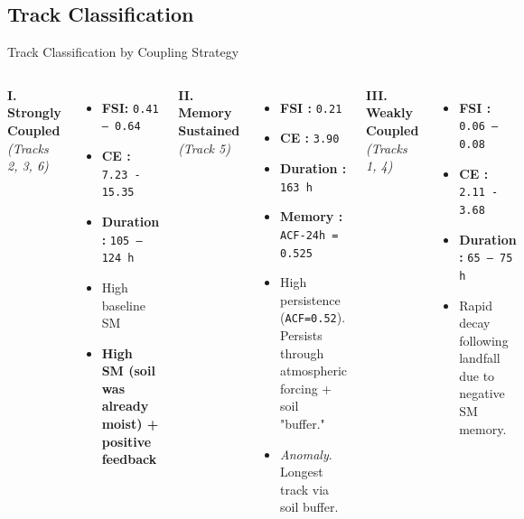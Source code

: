 \documentclass[8pt, aspectratio=169]{beamer}
\begin{document}
\subsection{Track Classification}
\begin{frame}{Track Classification by Coupling Strategy}
    \footnotesize
    \begin{center}
        \begin{columns}[T]
            \textbf{I. Strongly Coupled} \textit{(Tracks 2, 3, 6)}
            \begin{itemize}
                \item \textbf{FSI:} \texttt{0.41 -- 0.64}
                \item \textbf{CE :} \texttt{7.23 - 15.35}
                \item \textbf{Duration :} \texttt{105 -- 124 h}
                \item High baseline SM 
                \item \textbf{High SM (soil was already moist) + positive feedback}
            \end{itemize}

            \textbf{II. Memory Sustained} \textit{(Track 5)}
            \begin{itemize}
                \item \textbf{FSI :} \texttt{0.21}
                \item \textbf{CE :} \texttt{3.90}
                \item \textbf{Duration :} \texttt{163 h}
                \item \textbf{Memory :} \texttt{ACF-24h = 0.525}
                \item High persistence (\texttt{ACF=0.52}). Persists through atmospheric forcing + soil "buffer."
                \item \textit{Anomaly}. Longest track via soil buffer.
            \end{itemize}

            \textbf{III. Weakly Coupled} \textit{(Tracks 1, 4)}
            \begin{itemize}
                \item \textbf{FSI :} \texttt{0.06 -- 0.08}
                \item \textbf{CE :} \texttt{2.11 - 3.68}
                \item \textbf{Duration :} \texttt{65 -- 75 h}
                \item Rapid decay following landfall due to negative SM memory.
            \end{itemize}
        \end{columns}
    \end{center}


\end{frame}
\end{document}

